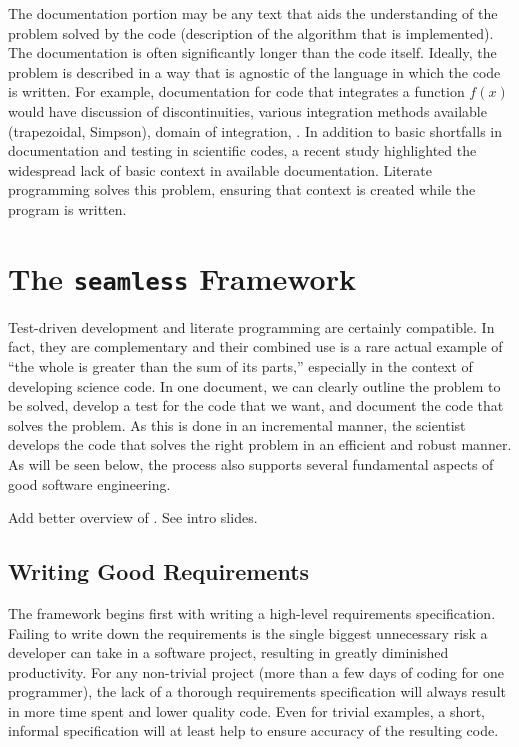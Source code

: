 The documentation portion may be any text that aids the understanding of the problem solved by the code 
(\eg description of the algorithm that is implemented).  The documentation is often significantly 
longer than the code itself. Ideally, the problem is described in a way that is agnostic of the language
in which the code is written.  For example, documentation for code that integrates a function $f(x)$ would
have discussion of discontinuities, various integration methods available (\eg trapezoidal, Simpson), 
domain of integration, \etc. 
In addition to basic shortfalls in documentation and testing in scientific codes, a recent 
study highlighted the widespread lack of basic context in available documentation.\cite{petre}
Literate programming solves this problem, ensuring that context is created while the program
is written.

\section{The \texttt{seamless} Framework}
Test-driven development and literate programming are certainly compatible.  In fact, they are 
complementary and their combined use is a rare actual example of ``the whole is greater
than the sum of its parts,'' especially in the context of developing science code.  
In one document, we can clearly outline the problem to be solved, develop a test for the 
code that we want, and document the code that solves the problem. As this is done in an incremental
manner, the scientist develops the code that solves the right problem in an efficient and robust manner.
As will be seen below, the process also supports several fundamental aspects of good software
engineering.

\begin{TODO}
  Add better overview of \seamless. See intro slides.
\end{TODO}

\subsection{Writing Good Requirements}\label{good-requirements}

The \seamless framework begins first with writing a high-level requirements specification.
Failing to write down the requirements is the single biggest unnecessary risk a developer
can take in a software project, resulting in greatly diminished productivity. 
For any non-trivial project (more than a few days of coding for one programmer), 
the lack of a thorough requirements specification will always result in more time spent and lower quality code.
Even for trivial examples, a short, informal specification will at least help to ensure
accuracy of the resulting code.

